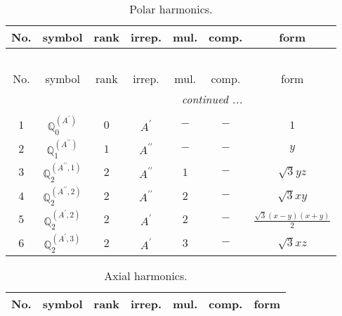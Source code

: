 \documentclass[fleqn,10pt,landscape]{article}
\begin{document}
\begin{itemize}
\begin{center}
\renewcommand{\arraystretch}{1.3}
\begin{longtable}{ccccccc}
\caption{Polar harmonics.}
 \\
 \hline \hline
No. & symbol & rank & irrep. & mul. & comp. & form \\ \hline \endfirsthead

\multicolumn{6}{l}{\tablename\ \thetable{}} \\
 \hline \hline
No. & symbol & rank & irrep. & mul. & comp. & form \\ \hline \endhead

 \hline \hline
\multicolumn{6}{r}{\footnotesize\it continued ...} \\ \endfoot

 \hline \hline
\multicolumn{6}{r}{} \\ \endlastfoot

$ 1 $ & $ \mathbb{Q}_{0}^{(A^{\prime})} $ & $ 0 $ & $ A^{\prime} $ & $ - $ & $ - $ & $ 1 $ \\ \hline
$ 2 $ & $ \mathbb{Q}_{1}^{(A^{\prime\prime})} $ & $ 1 $ & $ A^{\prime\prime} $ & $ - $ & $ - $ & $ y $ \\ \hline
$ 3 $ & $ \mathbb{Q}_{2}^{(A^{\prime\prime},1)} $ & $ 2 $ & $ A^{\prime\prime} $ & $ 1 $ & $ - $ & $ \sqrt{3} y z $ \\
$ 4 $ & $ \mathbb{Q}_{2}^{(A^{\prime\prime},2)} $ & $ 2 $ & $ A^{\prime\prime} $ & $ 2 $ & $ - $ & $ \sqrt{3} x y $ \\
$ 5 $ & $ \mathbb{Q}_{2}^{(A^{\prime},2)} $ & $ 2 $ & $ A^{\prime} $ & $ 2 $ & $ - $ & $ \frac{\sqrt{3} \left(x - y\right) \left(x + y\right)}{2} $ \\
$ 6 $ & $ \mathbb{Q}_{2}^{(A^{\prime},3)} $ & $ 2 $ & $ A^{\prime} $ & $ 3 $ & $ - $ & $ \sqrt{3} x z $ \\
\end{longtable}
\end{center}
\begin{center}
\renewcommand{\arraystretch}{1.3}
\begin{longtable}{ccccccc}
\caption{Axial harmonics.}
 \\
 \hline \hline
No. & symbol & rank & irrep. & mul. & comp. & form \\ \hline \endfirsthead


\end{longtable}
\end{center}
\end{itemize}
\end{document}

